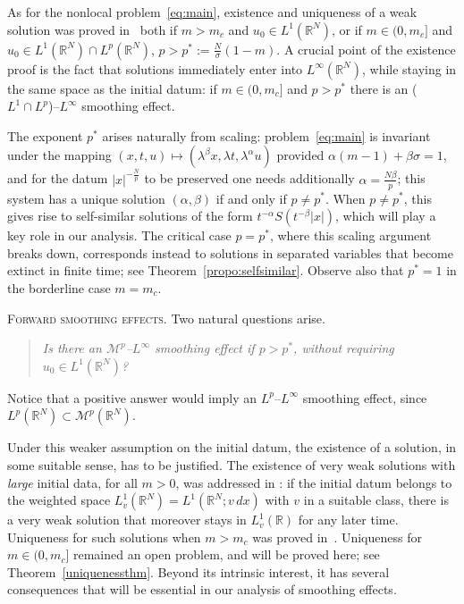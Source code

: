 \documentclass[leqno,12pt]{amsart}
\theoremstyle{definition}
\theoremstyle{remark}
\numberwithin{equation}{section}
\begin{document}
As for the nonlocal problem~\eqref{eq:main}, existence and uniqueness of a weak solution was proved in~\cite{b1}  both if $m>m_c$ and $u_0\in L^1(\mathbb{R}^N)$, or if $m\in (0,m_c]$ and  $u_0\in L^1(\mathbb{R}^N)\cap L^p(\mathbb{R}^N)$, $p>p^*:=\frac{N}{\sigma}(1-m)$. A crucial point of the existence proof is the fact that solutions  immediately enter into $L^\infty(\mathbb{R}^N)$, while staying in the same space as the initial datum: if $m\in(0,m_c]$ and $p>p^*$ there is an ($L^1\cap L^p$)--$L^\infty$ smoothing effect. 

The exponent $p^*$ arises naturally from scaling: problem~\eqref{eq:main} is invariant under the mapping $(x,t,u)\mapsto(\lambda^\beta x,\lambda t,\lambda^\alpha u)$ provided $\alpha(m-1)+\beta\sigma=1$, and for the datum $|x|^{-\frac{N}{p}}$ to be preserved one needs additionally $\alpha=\frac{N\beta}{p}$; this system 
has a unique solution $(\alpha,\beta)$ if and only if $p\neq p^*$. When $p\neq p^*$, this gives rise to self-similar solutions of the form $t^{-\alpha}S(t^{-\beta}|x|)$, which will play a key role in our analysis. The critical case $p=p^*$, where this scaling argument breaks down, corresponds instead to solutions in separated 
variables that become extinct in finite time; see Theorem~\ref{propo:selfsimilar}. Observe also that $p^*=1$ in the borderline case $m=m_c$.

\noindent\textsc{Forward smoothing effects. } Two natural questions arise. 
\begin{quote} 
    \centering
    \emph{Is there an $\mathcal{M}^p$--$L^\infty$ smoothing effect if $p>p^*$, without requiring $u_0\in L^1(\mathbb{R}^N)$?} 
\end{quote}
Notice that a positive answer would imply an $L^p$--$L^\infty$ smoothing effect, since $L^p(\mathbb{R}^N)\subset \mathcal{M}^p(\mathbb{R}^N)$.

Under this weaker assumption on the initial datum, the existence of a solution, in some suitable sense, has to be justified. The existence of very weak solutions with \emph{large} initial data, for all $m>0$, was addressed in \cite{b3}:  if the initial datum belongs to the weighted space $L^1_v(\mathbb{R}^N)=L^1(\mathbb{R}^N;v\,dx)$ with $v$ in a suitable class, there is a very weak solution that moreover stays in $L^1_v(\mathbb{R})$ for any later time. Uniqueness for such solutions when $m>m_c$ was proved in~\cite{jorge}. Uniqueness for $m\in(0,m_c]$ remained an open problem, and will be proved here; see Theorem~\ref{uniquenessthm}. Beyond its intrinsic interest, it has several consequences that will be essential in our analysis of smoothing effects. 
\end{document}
